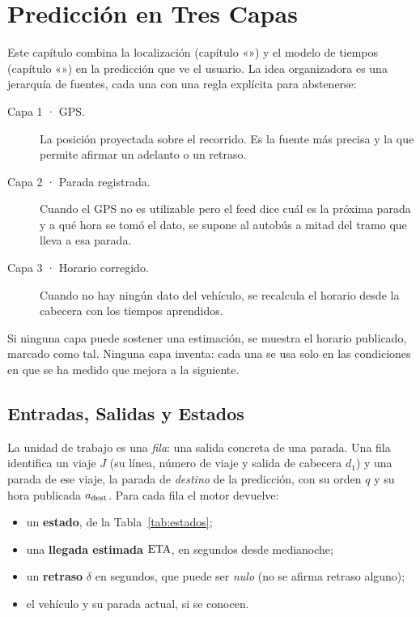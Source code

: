 \chapter{Predicción en Tres Capas}
\label{cap:prediccion}

Este capítulo combina la localización (capítulo «») y el modelo de tiempos
(capítulo «») en la predicción que ve el usuario. La idea organizadora es una jerarquía de fuentes,
cada una con una regla explícita para abstenerse:

\begin{description}
  \item[Capa 1 · GPS.] La posición proyectada sobre el recorrido. Es la fuente más precisa y la que permite afirmar un
        adelanto o un retraso.
  \item[Capa 2 · Parada registrada.] Cuando el GPS no es utilizable pero el feed dice cuál es la próxima parada y a qué
        hora se tomó el dato, se supone al autobús a mitad del tramo que lleva a esa parada.
  \item[Capa 3 · Horario corregido.] Cuando no hay ningún dato del vehículo, se recalcula el horario desde la cabecera
        con los tiempos aprendidos.
\end{description}

\noindent Si ninguna capa puede sostener una estimación, se muestra el horario publicado, marcado como tal. Ninguna
capa inventa: cada una se usa solo en las condiciones en que se ha medido que mejora a la siguiente.

\section{Entradas, Salidas y Estados}
\label{sec:estados}

La unidad de trabajo es una \emph{fila}: una salida concreta de una parada. Una fila identifica un viaje $J$ (su
línea, número de viaje y salida de cabecera $d_1$) y una parada de ese viaje, la parada de \emph{destino} de la
predicción, con su orden $q$ y su hora publicada $a_{\mathrm{dest}}$. Para cada fila el motor devuelve:

\begin{itemize}
  \item un \textbf{estado}, de la Tabla~\ref{tab:estados};
  \item una \textbf{llegada estimada} $\mathrm{ETA}$, en segundos desde medianoche;
  \item un \textbf{retraso} $\delta$ en segundos, que puede ser \emph{nulo} (no se afirma retraso alguno);
  \item el vehículo y su parada actual, si se conocen.
\end{itemize}

